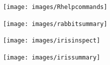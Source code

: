 \documentclass{beamer}
\begin{document}
 	
 	\begin{frame}
 		\begin{figure}
 			\centering
 			\texttt{[image: images/Rhelpcommands]}
 		\end{figure}
 	\end{frame}   
 	
 	\begin{frame}
 		\begin{figure}
 			\centering
 			\texttt{[image: images/rabbitsummary]}   
 		\end{figure}
 	\end{frame} 
 	
 	
 	\begin{frame}
 		\begin{figure}  
 			\texttt{[image: images/irisinspect]}     
 		\end{figure}
 	\end{frame}   
 	\begin{frame}
\begin{figure}
\centering
\texttt{[image: images/irissummary]}
\caption{}
\label{fig:irissummary}
\end{figure}
 	\end{frame}   
 	
\end{document}
